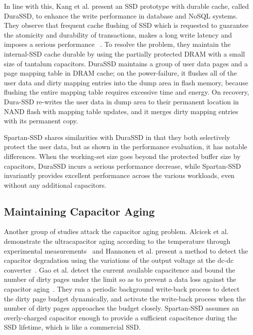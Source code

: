 In line with this, Kang et al. present an SSD prototype with durable cache,
called DuraSSD, to enhance the write performance in database and NoSQL systems.
They observe that frequent cache flushing of SSD which is requested to
guarantee the atomicity and durability of transactions, makes a long write
latency and imposes a serious performance ~\cite{KangLMKO14sigmod}. To
resolve the problem, they maintain the internal-SSD cache
durable by using the partially protected DRAM with a small size of tantalum
capacitors. DuraSSD maintains a group of user data pages and a page mapping
table in DRAM cache; on the power-failure, it flushes all of the user data and
dirty mapping entries into the dump area in flash memory, because flushing
the entire mapping table requires excessive time and energy.  On recovery,
Dura-SSD re-writes the user data in dump area to their permanent location in
NAND flash with mapping table updates, and it merges dirty mapping entries with
its permanent copy.

Spartan-SSD shares similarities with DuraSSD in that they both selectively
protect the user data, but as shown in the performance evaluation, it has
notable differences. When the working-set size goes beyond the protected buffer
size by capacitors, DuraSSD incurs a serious performance decrease, while
Spartan-SSD invariantly provides excellent performance across the various
workloads, even without any additional capacitors.


\subsection{Maintaining Capacitor Aging}
Another group of studies attack the capacitor aging problem.  Alcicek et al.
demonstrate the ultracapacitor aging according to the temperature through
experimental measurements~\cite{alcicek2007experimental} and Hannonen
et al. present a method to detect the capacitor degradation using the
variations of the output voltage at the dc-dc converter~\cite{TIA2016}. Gao et
al. detect the current available capacitence and bound the number of dirty
pages under the limit so as to prevent a data loss against the capacitor
aging~\cite{GaoSDLXS18glvlsi, GaoSLLXYZ19tcad}. They run a periodic background
write-back process to detect the dirty page budget dynamically, and activate
the write-back process when the number of dirty pages approaches the budget
closely. Spartan-SSD assumes an overly-charged capacitor enough to provide a
sufficient capacitence during the SSD lifetime, which is like a commercial SSD.


